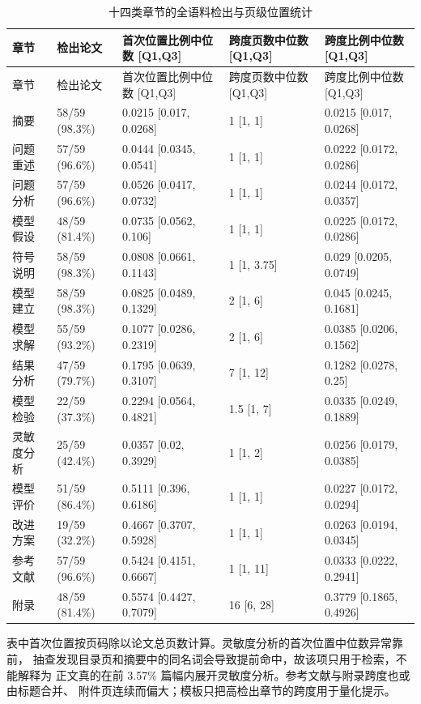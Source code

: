 \begin{longtable}{p{1.8cm}p{2.5cm}p{3.0cm}p{2.8cm}p{3.0cm}}
\caption{十四类章节的全语料检出与页级位置统计}\label{tab:section-stats}\\
\toprule
章节 & 检出论文 & 首次位置比例中位数 [Q1,Q3] & 跨度页数中位数 [Q1,Q3] & 跨度比例中位数 [Q1,Q3]\\
\midrule
\endfirsthead
\toprule
章节 & 检出论文 & 首次位置比例中位数 [Q1,Q3] & 跨度页数中位数 [Q1,Q3] & 跨度比例中位数 [Q1,Q3]\\
\midrule
\endhead
摘要 & 58/59 (98.3\%) & 0.0215 [0.017, 0.0268] & 1 [1, 1] & 0.0215 [0.017, 0.0268]\\
问题重述 & 57/59 (96.6\%) & 0.0444 [0.0345, 0.0541] & 1 [1, 1] & 0.0222 [0.0172, 0.0286]\\
问题分析 & 57/59 (96.6\%) & 0.0526 [0.0417, 0.0732] & 1 [1, 1] & 0.0244 [0.0172, 0.0357]\\
模型假设 & 48/59 (81.4\%) & 0.0735 [0.0562, 0.106] & 1 [1, 1] & 0.0225 [0.0172, 0.0286]\\
符号说明 & 58/59 (98.3\%) & 0.0808 [0.0661, 0.1143] & 1 [1, 3.75] & 0.029 [0.0205, 0.0749]\\
模型建立 & 58/59 (98.3\%) & 0.0825 [0.0489, 0.1329] & 2 [1, 6] & 0.045 [0.0245, 0.1681]\\
模型求解 & 55/59 (93.2\%) & 0.1077 [0.0286, 0.2319] & 2 [1, 6] & 0.0385 [0.0206, 0.1562]\\
结果分析 & 47/59 (79.7\%) & 0.1795 [0.0639, 0.3107] & 7 [1, 12] & 0.1282 [0.0278, 0.25]\\
模型检验 & 22/59 (37.3\%) & 0.2294 [0.0564, 0.4821] & 1.5 [1, 7] & 0.0335 [0.0249, 0.1889]\\
灵敏度分析 & 25/59 (42.4\%) & 0.0357 [0.02, 0.3929] & 1 [1, 2] & 0.0256 [0.0179, 0.0385]\\
模型评价 & 51/59 (86.4\%) & 0.5111 [0.396, 0.6186] & 1 [1, 1] & 0.0227 [0.0172, 0.0294]\\
改进方案 & 19/59 (32.2\%) & 0.4667 [0.3707, 0.5928] & 1 [1, 1] & 0.0263 [0.0194, 0.0345]\\
参考文献 & 57/59 (96.6\%) & 0.5424 [0.4151, 0.6667] & 1 [1, 11] & 0.0333 [0.0222, 0.2941]\\
附录 & 48/59 (81.4\%) & 0.5574 [0.4427, 0.7079] & 16 [6, 28] & 0.3779 [0.1865, 0.4926]\\
\bottomrule
\end{longtable}

表中首次位置按页码除以论文总页数计算。灵敏度分析的首次位置中位数异常靠前，
抽查发现目录页和摘要中的同名词会导致提前命中，故该项只用于检索，不能解释为
正文真的在前 3.57\% 篇幅内展开灵敏度分析。参考文献与附录跨度也或由标题合并、
附件页连续而偏大；模板只把高检出章节的跨度用于量化提示。

